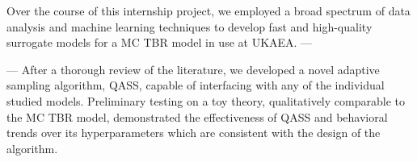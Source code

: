 Over the course of this internship project, we employed a broad spectrum of data analysis and machine learning techniques to develop fast and high-quality surrogate models for a MC TBR model in use at UKAEA. 
---


---
After a thorough review of the literature, we developed a novel adaptive sampling algorithm, QASS, capable of interfacing with any of the individual studied models. Preliminary testing on a toy theory, qualitatively comparable to the MC TBR model, demonstrated the effectiveness of QASS and behavioral trends over its hyperparameters which are consistent with the design of the algorithm.



\newpage
